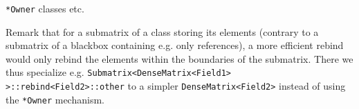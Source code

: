\verb!*Owner! classes etc.

Remark that for a submatrix of a class storing its elements (contrary
to a submatrix of a blackbox containing e.g. only references), a more
efficient rebind would only rebind the elements within the boundaries
of the submatrix. There we thus specialize
e.g. \texttt{Submatrix<DenseMatrix<Field1> >::rebind<Field2>::other}
to a simpler \texttt{DenseMatrix<Field2>} instead of using the
\verb!*Owner! mechanism.

